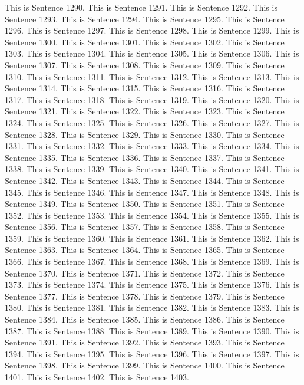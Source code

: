 \documentclass{article}
\begin{document}
This is Sentence 1290.
This is Sentence 1291.
This is Sentence 1292.
This is Sentence 1293.
This is Sentence 1294.
This is Sentence 1295.
This is Sentence 1296.
This is Sentence 1297.
This is Sentence 1298.
This is Sentence 1299.
This is Sentence 1300.
This is Sentence 1301.
This is Sentence 1302.
This is Sentence 1303.
This is Sentence 1304.
This is Sentence 1305.
This is Sentence 1306.
This is Sentence 1307.
This is Sentence 1308.
This is Sentence 1309.
This is Sentence 1310.
This is Sentence 1311.
This is Sentence 1312.
This is Sentence 1313.
This is Sentence 1314.
This is Sentence 1315.
This is Sentence 1316.
This is Sentence 1317.
This is Sentence 1318.
This is Sentence 1319.
This is Sentence 1320.
This is Sentence 1321.
This is Sentence 1322.
This is Sentence 1323.
This is Sentence 1324.
This is Sentence 1325.
This is Sentence 1326.
This is Sentence 1327.
This is Sentence 1328.
This is Sentence 1329.
This is Sentence 1330.
This is Sentence 1331.
This is Sentence 1332.
This is Sentence 1333.
This is Sentence 1334.
This is Sentence 1335.
This is Sentence 1336.
This is Sentence 1337.
This is Sentence 1338.
This is Sentence 1339.
This is Sentence 1340.
This is Sentence 1341.
This is Sentence 1342.
This is Sentence 1343.
This is Sentence 1344.
This is Sentence 1345.
This is Sentence 1346.
This is Sentence 1347.
This is Sentence 1348.
This is Sentence 1349.
This is Sentence 1350.
This is Sentence 1351.
This is Sentence 1352.
This is Sentence 1353.
This is Sentence 1354.
This is Sentence 1355.
This is Sentence 1356.
This is Sentence 1357.
This is Sentence 1358.
This is Sentence 1359.
This is Sentence 1360.
This is Sentence 1361.
This is Sentence 1362.
This is Sentence 1363.
This is Sentence 1364.
This is Sentence 1365.
This is Sentence 1366.
This is Sentence 1367.
This is Sentence 1368.
This is Sentence 1369.
This is Sentence 1370.
This is Sentence 1371.
This is Sentence 1372.
This is Sentence 1373.
This is Sentence 1374.
This is Sentence 1375.
This is Sentence 1376.
This is Sentence 1377.
This is Sentence 1378.
This is Sentence 1379.
This is Sentence 1380.
This is Sentence 1381.
This is Sentence 1382.
This is Sentence 1383.
This is Sentence 1384.
This is Sentence 1385.
This is Sentence 1386.
This is Sentence 1387.
This is Sentence 1388.
This is Sentence 1389.
This is Sentence 1390.
This is Sentence 1391.
This is Sentence 1392.
This is Sentence 1393.
This is Sentence 1394.
This is Sentence 1395.
This is Sentence 1396.
This is Sentence 1397.
This is Sentence 1398.
This is Sentence 1399.
This is Sentence 1400.
This is Sentence 1401.
This is Sentence 1402.
This is Sentence 1403.
\end{document}
